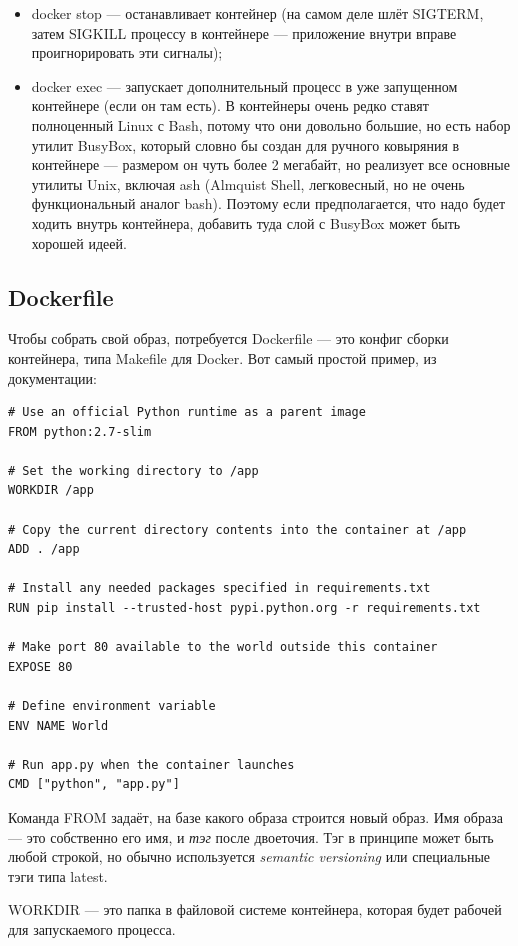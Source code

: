 \documentclass[a5paper]{article}
\begin{document}
\begin{itemize}
    \item docker stop --- останавливает контейнер (на самом деле шлёт SIGTERM, затем SIGKILL процессу в контейнере --- приложение внутри вправе проигнорировать эти сигналы);
    \item docker exec --- запускает дополнительный процесс в уже запущенном контейнере (если он там есть). В контейнеры очень редко ставят полноценный Linux с Bash, потому что они довольно большие, но есть набор утилит BusyBox, который словно бы создан для ручного ковыряния в контейнере --- размером он чуть более 2 мегабайт, но реализует все основные утилиты Unix, включая ash (Almquist Shell, легковесный, но не очень функциональный аналог bash). Поэтому если предполагается, что надо будет ходить внутрь контейнера, добавить туда слой с BusyBox может быть хорошей идеей.
\end{itemize}

\subsection{Dockerfile}

Чтобы собрать свой образ, потребуется Dockerfile --- это конфиг сборки контейнера, типа Makefile для Docker. Вот самый простой пример, из документации:

\begin{verbatim}
# Use an official Python runtime as a parent image
FROM python:2.7-slim

# Set the working directory to /app
WORKDIR /app

# Copy the current directory contents into the container at /app
ADD . /app

# Install any needed packages specified in requirements.txt
RUN pip install --trusted-host pypi.python.org -r requirements.txt

# Make port 80 available to the world outside this container
EXPOSE 80

# Define environment variable
ENV NAME World

# Run app.py when the container launches
CMD ["python", "app.py"]
\end{verbatim}

Команда FROM задаёт, на базе какого образа строится новый образ. Имя образа --- это собственно его имя, и \emph{тэг} после двоеточия. Тэг в принципе может быть любой строкой, но обычно используется \emph{semantic versioning} или специальные тэги типа latest.

WORKDIR --- это папка в файловой системе контейнера, которая будет рабочей для запускаемого процесса. 
\end{document}

